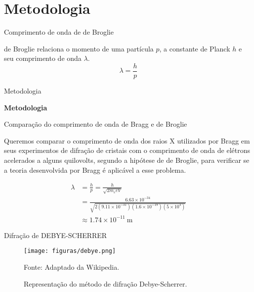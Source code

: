 \documentclass[aspectratio=169,12.5pt,xcolor=dvipsnames]{beamer}
\begin{document}
\section{Metodologia}


\begin{frame}{Comprimento de onda de de Broglie}

    de Broglie relaciona o momento de uma partícula $p$, a constante de Planck $h$ e seu comprimento de onda $\lambda$.        
    \begin{equation}
        \lambda = \frac{h}{p}
    \end{equation}

\end{frame}

\begin{frame}{Metodologia}
    \Huge{\centerline{\textbf{Metodologia}}}
\end{frame}

\begin{frame}{Comparação do comprimento de onda de Bragg e de Broglie}

Queremos comparar o comprimento de onda dos raios X utilizados por Bragg em seus experimentos de difração de cristais com o comprimento de onda de elétrons acelerados a alguns quilovolts, segundo a hipótese de de Broglie, para verificar se a teoria desenvolvida por Bragg é aplicável a esse problema.

\begin{equation}
\begin{aligned}
\lambda &= \frac{h}{p} = \frac{h}{\sqrt{2 m_e e V}} \\[6pt]
        &= \frac{6.63 \times 10^{-34}}
        {\sqrt{2 (9.11 \times 10^{-31})(1.6 \times 10^{-19})(5 \times 10^3)}} \\[6pt]
        &\approx 1.74 \times 10^{-11} \ \text{m}
\end{aligned}
\end{equation}
\end{frame}

\begin{frame}{Difração de DEBYE-SCHERRER}

        \begin{center}
        \begin{figure}
        \caption{Representação do método de difração Debye-Scherrer.}
        \vspace*{-0.25cm}
        \texttt{[image: figuras/debye.png]}\par
        {\scriptsize Fonte: Adaptado da Wikipedia.}
        \end{figure}
        \end{center}
    
\end{frame}
\end{document}
